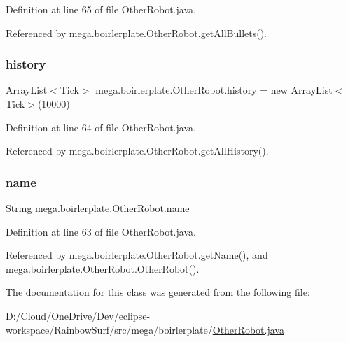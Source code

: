 Definition at line 65 of file Other\+Robot.\+java.



Referenced by mega.\+boirlerplate.\+Other\+Robot.\+get\+All\+Bullets().

\mbox{\label{classmega_1_1boirlerplate_1_1_other_robot_a41d199da2bfe68124c73c6b78abd3fe9}} 
\subsubsection{\texorpdfstring{history}{history}}
{\footnotesize\ttfamily Array\+List$<$Tick$>$ mega.\+boirlerplate.\+Other\+Robot.\+history = new Array\+List$<$Tick$>$(10000)\hspace{0.3cm}{\ttfamily [private]}}



Definition at line 64 of file Other\+Robot.\+java.



Referenced by mega.\+boirlerplate.\+Other\+Robot.\+get\+All\+History().

\mbox{\label{classmega_1_1boirlerplate_1_1_other_robot_ac6f8d81032357e6a08992ddb2dc84cb4}} 
\subsubsection{\texorpdfstring{name}{name}}
{\footnotesize\ttfamily String mega.\+boirlerplate.\+Other\+Robot.\+name\hspace{0.3cm}{\ttfamily [private]}}



Definition at line 63 of file Other\+Robot.\+java.



Referenced by mega.\+boirlerplate.\+Other\+Robot.\+get\+Name(), and mega.\+boirlerplate.\+Other\+Robot.\+Other\+Robot().



The documentation for this class was generated from the following file\+:\begin{DoxyCompactItemize}
\item 
D\+:/\+Cloud/\+One\+Drive/\+Dev/eclipse-\/workspace/\+Rainbow\+Surf/src/mega/boirlerplate/\hyperlink{_other_robot_8java}{Other\+Robot.\+java}\end{DoxyCompactItemize}
